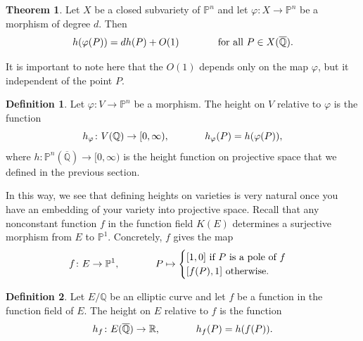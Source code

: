 \documentclass{article}
\newcommand{\R}{\mathbb{R}}
\newcommand{\Q}{\mathbb{Q}}
\theoremstyle{definition}
\renewcommand{\P}{\mathbb{P}}
\newtheorem{theorem}{Theorem}[section]
\newtheorem{definition}{Definition}
\begin{document}
\begin{theorem}\label{morphismheight}
    Let $X$ be a closed subvariety of $\P^n$ and let $\varphi \colon X \to \P^n$ be a morphism of degree $d$. Then
    $$h(\varphi(P)) = dh(P) + O(1) \hspace{.5in} \text{ for all } P \in X(\overline{\Q}).$$
\end{theorem}
\noindent It is important to note here that the $O(1)$ depends only on the map $\varphi$, but it independent of the point $P$.

\begin{definition}\label{heightonV}
    Let $\varphi \colon V \to \P^n$ be a morphism. The height on $V$ relative to $\varphi$ is the function
    $$h_\varphi \colon V(\Q) \to [0, \infty), \hspace{.5in} h_\varphi(P) = h(\varphi(P)),$$
    where $h \colon \P^n(\overline{\Q}) \to [0,\infty)$ is the height function on projective space that we defined in the previous section. 
\end{definition}
\noindent In this way, we see that defining heights on varieties is very natural once you have an embedding of your variety into projective space. Recall that any nonconstant function $f$ in the function field $K(E)$ determines a surjective morphism from $E$ to $\P^1$. Concretely, $f$ gives the map
$$f \colon E \to \P^1, \hspace{.5in} P \mapsto \begin{cases}
    [1,0] \text{ if } P \text{ is a pole of } f \\
    [f(P),1] \text{ otherwise. }  
\end{cases}$$

\begin{definition}\label{heightonE}
    Let $E/\Q$ be an elliptic curve and let $f$ be a function in the function field of $E$. The height on $E$ relative to $f$ is the function
    $$h_f \colon E(\overline{\Q}) \to \R, \hspace{.5in} h_f(P) = h(f(P)).$$
\end{definition}
\end{document}
